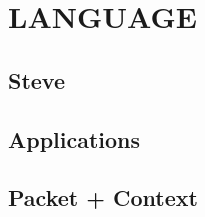\chapter{LANGUAGE}
\label{lang}

\section{Steve}
\label{lang:steve}

\section{Applications}
\label{lang:apps}

\section{Packet + Context}
\label{lang:context}
